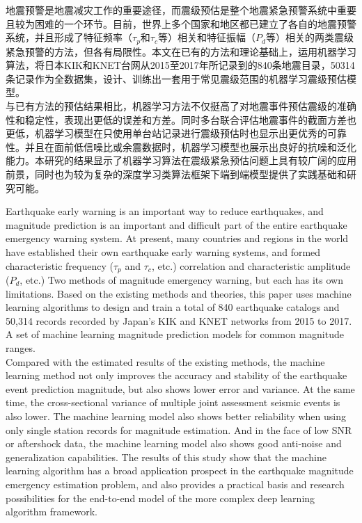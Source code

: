 
\begin{cabstract}
\indent 地震预警是地震减灾工作的重要途径，而震级预估是整个地震紧急预警系统中重要且较为困难的一个环节。目前，世界上多个国家和地区都已建立了各自的地震预警系统，并且形成了特征频率（$\tau_{p}$和$\tau_{c}$等）相关和特征振幅（$P_{d}$等）相关的两类震级紧急预警的方法，但各有局限性。本文在已有的方法和理论基础上，运用机器学习算法，将日本KIK和KNET台网从2015至2017年所记录到的840条地震目录，50314条记录作为全数据集，设计、训练出一套用于常见震级范围的机器学习震级预估模型。\\
\indent 与已有方法的预估结果相比，机器学习方法不仅挺高了对地震事件预估震级的准确性和稳定性，表现出更低的误差和方差。同时多台联合评估地震事件的截面方差也更低，机器学习模型在只使用单台站记录进行震级预估时也显示出更优秀的可靠性。并且在面前低信噪比或余震数据时，机器学习模型也展示出良好的抗噪和泛化能力。本研究的结果显示了机器学习算法在震级紧急预估问题上具有较广阔的应用前景，同时也为较为复杂的深度学习类算法框架下端到端模型提供了实践基础和研究可能。\\
\end{cabstract}

\begin{eabstract}
\indent Earthquake early warning is an important way to reduce earthquakes, and magnitude prediction is an important and difficult part of the entire earthquake emergency warning system. At present, many countries and regions in the world have established their own earthquake early warning systems, and formed characteristic frequency ($\tau_{p}$ and $\tau_{c}$, etc.) correlation and characteristic amplitude ($P_{ d}$, etc.) Two methods of magnitude emergency warning, but each has its own limitations. Based on the existing methods and theories, this paper uses machine learning algorithms to design and train a total of 840 earthquake catalogs and 50,314 records recorded by Japan's KIK and KNET networks from 2015 to 2017. A set of machine learning magnitude prediction models for common magnitude ranges. \\
\indent Compared with the estimated results of the existing methods, the machine learning method not only improves the accuracy and stability of the earthquake event prediction magnitude, but also shows lower error and variance. At the same time, the cross-sectional variance of multiple joint assessment seismic events is also lower. The machine learning model also shows better reliability when using only single station records for magnitude estimation. And in the face of low SNR or aftershock data, the machine learning model also shows good anti-noise and generalization capabilities. The results of this study show that the machine learning algorithm has a broad application prospect in the earthquake magnitude emergency estimation problem, and also provides a practical basis and research possibilities for the end-to-end model of the more complex deep learning algorithm framework. \\
\end{eabstract}

